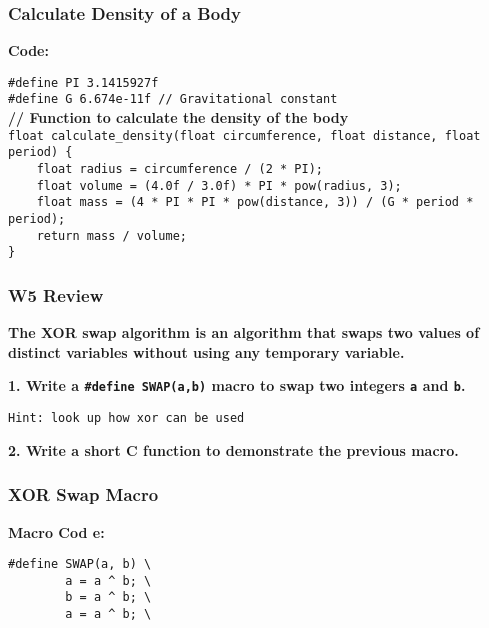 \documentclass[
	11pt, %
]{beamer}
\begin{document}
\begin{frame}
    \frametitle{Calculate Density of a Body}
    \textbf{Code:}
	
    \texttt{\#define PI 3.1415927f} \\ 
    \texttt{\#define G 6.674e-11f // Gravitational constant} \\[7pt]
    \textbf{// Function to calculate the density of the body} \\ 
    \texttt{float calculate\_density(float circumference, float distance, float period) \{} \\ 
    \texttt{~~~~float radius = circumference / (2 * PI);} \\ 
    \texttt{~~~~float volume = (4.0f / 3.0f) * PI * pow(radius, 3);} \\ 
    \texttt{~~~~float mass = (4 * PI * PI * pow(distance, 3)) / (G * period * period);} \\ 
    \texttt{~~~~return mass / volume;} \\ 
    \texttt{\}}
\end{frame}


\begin{frame}
    \frametitle{W5 Review}
    \textbf{The XOR swap algorithm is an algorithm that swaps two values of distinct variables without using any temporary variable.}

    \smallskip

    \textbf{1. Write a \texttt{\#define SWAP(a,b)} macro to swap two integers \texttt{a} and \texttt{b}.}
    
    \smallskip
	\texttt{Hint: look up how xor can be used}

    \textbf{2. Write a short C function to demonstrate the previous macro.}

    \smallskip


\end{frame}


\begin{frame}
    \frametitle{XOR Swap Macro}
    \textbf{Macro Cod e:}
    
    \texttt{\#define SWAP(a, b) \textbackslash} \\
    \texttt{\ \ \ \ \ \ \ \ a = a \^{} b; \textbackslash} \\
    \texttt{\ \ \ \ \ \ \ \ b = a \^{} b; \textbackslash} \\
    \texttt{\ \ \ \ \ \ \ \ a = a \^{} b; \textbackslash} \\
\end{frame}
\end{document}
